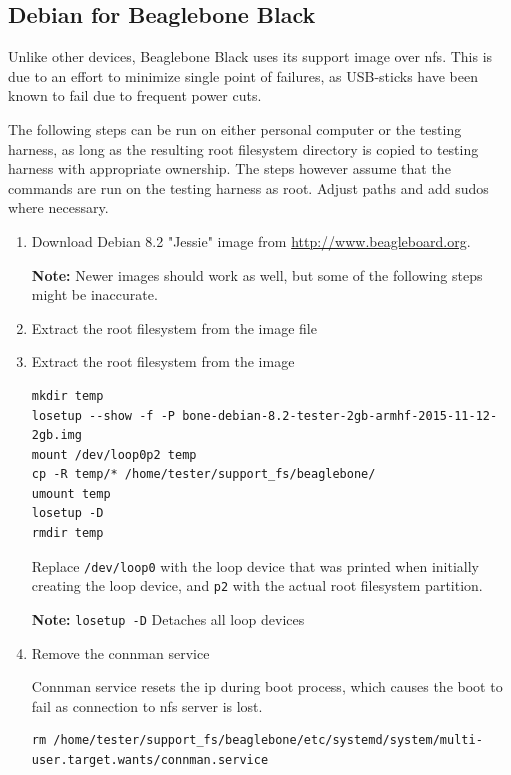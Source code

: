\documentclass[a4paper,11pt]{article}
\newcommand{\note}{\textbf{Note: }}
\newcommand{\cmd}[1]{\texttt{#1}}
\begin{document}
\subsection{Debian for Beaglebone Black}
\label{bbbdebian}

Unlike other devices, Beaglebone Black uses its support image over nfs. This is due to an effort to minimize single point of failures, as USB-sticks have been known to fail due to frequent power cuts. 

The following steps can be run on either personal computer or the testing harness, as long as the resulting root filesystem directory is copied to testing harness with appropriate ownership. The steps however assume that the commands are run on the testing harness as root. Adjust paths and add sudos where necessary.


\begin{enumerate}
\item Download Debian 8.2 "Jessie" image from \url{http://www.beagleboard.org}.

\note Newer images should work as well, but some of the following steps might be inaccurate.

\item Extract the root filesystem from the image file


\item Extract the root filesystem from the image

\begin{lstlisting}
mkdir temp
losetup --show -f -P bone-debian-8.2-tester-2gb-armhf-2015-11-12-2gb.img
mount /dev/loop0p2 temp
cp -R temp/* /home/tester/support_fs/beaglebone/ 
umount temp
losetup -D 
rmdir temp
\end{lstlisting}

Replace \cmd{/dev/loop0} with the loop device that was printed when initially creating the loop device, and \cmd{p2} with the actual root filesystem partition.

\note \cmd{losetup -D} Detaches all loop devices

\item Remove the connman service

Connman service resets the ip during boot process, which causes the boot to fail as connection to nfs server is lost.


\begin{lstlisting}
rm /home/tester/support_fs/beaglebone/etc/systemd/system/multi-user.target.wants/connman.service
\end{lstlisting}


\end{enumerate}
\end{document}

